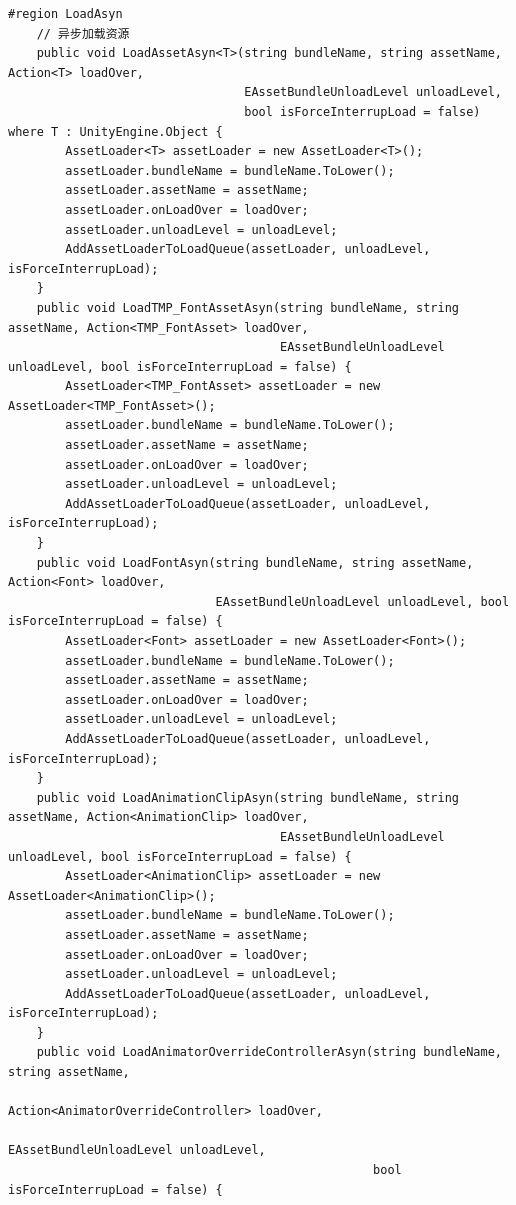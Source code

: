 \documentclass[9pt, b5paper]{article}
\begin{document}
\begin{verbatim}
#region LoadAsyn
    // 异步加载资源
    public void LoadAssetAsyn<T>(string bundleName, string assetName, Action<T> loadOver, 
                                 EAssetBundleUnloadLevel unloadLevel,
                                 bool isForceInterrupLoad = false) where T : UnityEngine.Object {
        AssetLoader<T> assetLoader = new AssetLoader<T>();
        assetLoader.bundleName = bundleName.ToLower();
        assetLoader.assetName = assetName;
        assetLoader.onLoadOver = loadOver;
        assetLoader.unloadLevel = unloadLevel;
        AddAssetLoaderToLoadQueue(assetLoader, unloadLevel, isForceInterrupLoad);
    }
    public void LoadTMP_FontAssetAsyn(string bundleName, string assetName, Action<TMP_FontAsset> loadOver, 
                                      EAssetBundleUnloadLevel unloadLevel, bool isForceInterrupLoad = false) {
        AssetLoader<TMP_FontAsset> assetLoader = new AssetLoader<TMP_FontAsset>();
        assetLoader.bundleName = bundleName.ToLower();
        assetLoader.assetName = assetName;
        assetLoader.onLoadOver = loadOver;
        assetLoader.unloadLevel = unloadLevel;
        AddAssetLoaderToLoadQueue(assetLoader, unloadLevel, isForceInterrupLoad);
    }
    public void LoadFontAsyn(string bundleName, string assetName, Action<Font> loadOver, 
                             EAssetBundleUnloadLevel unloadLevel, bool isForceInterrupLoad = false) {
        AssetLoader<Font> assetLoader = new AssetLoader<Font>();
        assetLoader.bundleName = bundleName.ToLower();
        assetLoader.assetName = assetName;
        assetLoader.onLoadOver = loadOver;
        assetLoader.unloadLevel = unloadLevel;
        AddAssetLoaderToLoadQueue(assetLoader, unloadLevel, isForceInterrupLoad);
    }
    public void LoadAnimationClipAsyn(string bundleName, string assetName, Action<AnimationClip> loadOver, 
                                      EAssetBundleUnloadLevel unloadLevel, bool isForceInterrupLoad = false) {
        AssetLoader<AnimationClip> assetLoader = new AssetLoader<AnimationClip>();
        assetLoader.bundleName = bundleName.ToLower();
        assetLoader.assetName = assetName;
        assetLoader.onLoadOver = loadOver;
        assetLoader.unloadLevel = unloadLevel;
        AddAssetLoaderToLoadQueue(assetLoader, unloadLevel, isForceInterrupLoad);
    }
    public void LoadAnimatorOverrideControllerAsyn(string bundleName, string assetName,
                                                   Action<AnimatorOverrideController> loadOver, 
                                                   EAssetBundleUnloadLevel unloadLevel,
                                                   bool isForceInterrupLoad = false) {

\end{verbatim}
\end{document}
